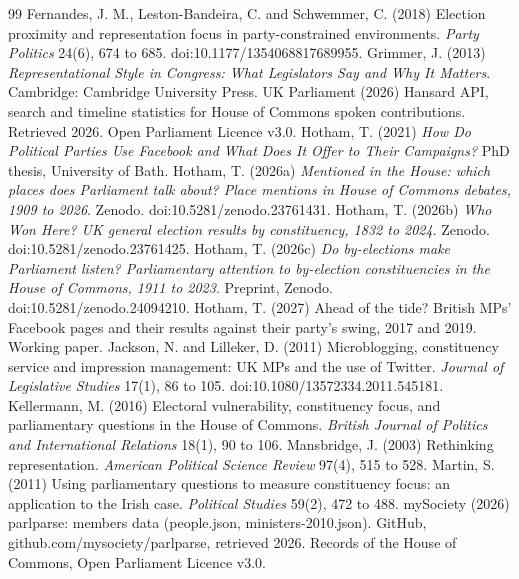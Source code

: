 \documentclass[11pt,a4paper]{article}
\begin{document}
\begin{thebibliography}{99}
 Fernandes, J. M., Leston-Bandeira, C. and Schwemmer, C. (2018) Election proximity and representation focus in party-constrained environments. \textit{Party Politics} 24(6), 674 to 685. doi:10.1177/1354068817689955.
 Grimmer, J. (2013) \textit{Representational Style in Congress: What Legislators Say and Why It Matters}. Cambridge: Cambridge University Press.
 UK Parliament (2026) Hansard API, search and timeline statistics for House of Commons spoken contributions. Retrieved 2026. Open Parliament Licence v3.0.
 Hotham, T. (2021) \textit{How Do Political Parties Use Facebook and What Does It Offer to Their Campaigns?} PhD thesis, University of Bath.
 Hotham, T. (2026a) \textit{Mentioned in the House: which places does Parliament talk about? Place mentions in House of Commons debates, 1909 to 2026}. Zenodo. doi:10.5281/zenodo.23761431.
 Hotham, T. (2026b) \textit{Who Won Here? UK general election results by constituency, 1832 to 2024}. Zenodo. doi:10.5281/zenodo.23761425.
 Hotham, T. (2026c) \textit{Do by-elections make Parliament listen? Parliamentary attention to by-election constituencies in the House of Commons, 1911 to 2023}. Preprint, Zenodo. doi:10.5281/zenodo.24094210.
 Hotham, T. (2027) Ahead of the tide? British MPs' Facebook pages and their results against their party's swing, 2017 and 2019. Working paper.
 Jackson, N. and Lilleker, D. (2011) Microblogging, constituency service and impression management: UK MPs and the use of Twitter. \textit{Journal of Legislative Studies} 17(1), 86 to 105. doi:10.1080/13572334.2011.545181.
 Kellermann, M. (2016) Electoral vulnerability, constituency focus, and parliamentary questions in the House of Commons. \textit{British Journal of Politics and International Relations} 18(1), 90 to 106.
 Mansbridge, J. (2003) Rethinking representation. \textit{American Political Science Review} 97(4), 515 to 528.
 Martin, S. (2011) Using parliamentary questions to measure constituency focus: an application to the Irish case. \textit{Political Studies} 59(2), 472 to 488.
 mySociety (2026) parlparse: members data (people.json, ministers-2010.json). GitHub, github.com/mysociety/parlparse, retrieved 2026. Records of the House of Commons, Open Parliament Licence v3.0.

\end{thebibliography}
\end{document}
